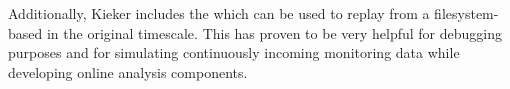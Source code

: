 Additionally, Kieker includes the \MonitoringLogReader{}  %
which can be used to replay \MonitoringRecords{} from a filesystem-based %
\MonitoringLog{} in the original timescale. This has proven to be very helpful for debugging purposes and for simulating %
continuously incoming monitoring data while developing online analysis components. %
% 
% 
% 
% 

